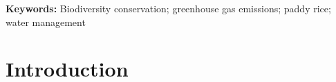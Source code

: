 

\noindent\textbf{Keywords:} Biodiversity conservation; greenhouse gas emissions; paddy rice; water management  %





\section{Introduction}
\label{sec:intro1}

